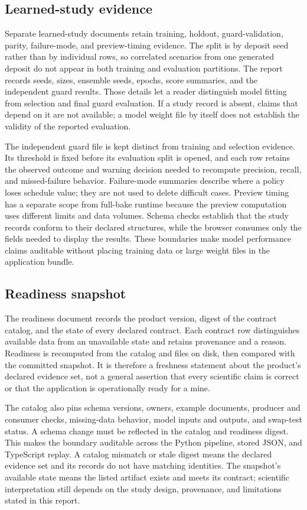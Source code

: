 \subsection{Learned-study evidence}
\label{sec:data-study}
Separate learned-study documents retain training, holdout, guard-validation, parity, failure-mode, and preview-timing evidence. The split is by deposit seed rather than by individual rows, so correlated scenarios from one generated deposit do not appear in both training and evaluation partitions. The report records seeds, sizes, ensemble seeds, epochs, score summaries, and the independent guard results. Those details let a reader distinguish model fitting from selection and final guard evaluation. If a study record is absent, claims that depend on it are not available; a model weight file by itself does not establish the validity of the reported evaluation.

The independent guard file is kept distinct from training and selection evidence. Its threshold is fixed before its evaluation split is opened, and each row retains the observed outcome and warning decision needed to recompute precision, recall, and missed-failure behavior. Failure-mode summaries describe where a policy loses schedule value; they are not used to delete difficult cases. Preview timing has a separate scope from full-bake runtime because the preview computation uses different limits and data volumes. Schema checks establish that the study records conform to their declared structures, while the browser consumes only the fields needed to display the results. These boundaries make model performance claims auditable without placing training data or large weight files in the application bundle.

\subsection{Readiness snapshot}
\label{sec:data-readiness}
The readiness document records the product version, digest of the contract catalog, and the state of every declared contract. Each contract row distinguishes available data from an unavailable state and retains provenance and a reason. Readiness is recomputed from the catalog and files on disk, then compared with the committed snapshot. It is therefore a freshness statement about the product's declared evidence set, not a general assertion that every scientific claim is correct or that the application is operationally ready for a mine.

The catalog also pins schema versions, owners, example documents, producer and consumer checks, missing-data behavior, model inputs and outputs, and swap-test status. A schema change must be reflected in the catalog and readiness digest. This makes the boundary auditable across the Python pipeline, stored JSON, and TypeScript replay. A catalog mismatch or stale digest means the declared evidence set and its records do not have matching identities. The snapshot's available state means the listed artifact exists and meets its contract; scientific interpretation still depends on the study design, provenance, and limitations stated in this report.

